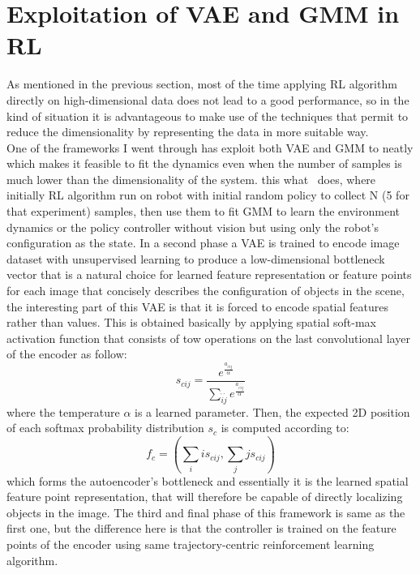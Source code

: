 \section{Exploitation of VAE and GMM in RL}
As mentioned in the previous section, most of the time applying RL algorithm directly on high-dimensional data does not lead to a good performance, so in the kind of situation it is advantageous to make use of the techniques that permit to reduce the dimensionality by representing the data in more suitable way.\\
One of the frameworks I went through has exploit both VAE and GMM to neatly which makes it feasible to fit the dynamics even when the number of samples is much lower than the dimensionality of the system. this what~\cite{finn2016deep} does, where initially RL algorithm run on robot with initial random policy to collect N (5 for that experiment) samples, then use them to fit GMM to learn the environment dynamics  or the policy controller without vision but using only the robot\textquoteright s configuration as the state. In a second phase a VAE is trained to encode image dataset with unsupervised learning to produce a low-dimensional bottleneck vector that is a natural choice for learned feature representation or feature points for each image that concisely describes the configuration of objects in the scene, the interesting part of this VAE is that it is forced to encode spatial features rather than values. This is obtained  basically by applying spatial soft-max activation function that consists of tow operations on the last convolutional layer of the encoder as follow:
\begin{equation}
s_{cij} = \frac {e^{\frac{a_{cij}}{\alpha}}}
{\sum_{\acute{i}\acute{j}} e^{ \frac {a_{c \acute{i} \acute{j}}}{\alpha}}}
\end{equation}
where the temperature $\alpha$ is a learned parameter. Then, the expected
2D position of each softmax probability distribution $s_c$ is
computed according to:
\begin{equation}
f_c = (\sum_i is_{cij} , \sum_j js_{cij} )
\end{equation}
which forms the autoencoder's bottleneck and essentially it is the learned spatial feature point representation, that will therefore be capable of directly localizing objects in the image. The third and final phase of this framework is same as the first one, but the difference here is that the controller is trained on the feature points of the encoder using same trajectory-centric reinforcement
learning algorithm.\\
